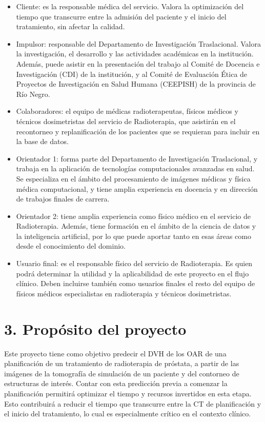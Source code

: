 \documentclass[
11pt, %
codirector, %
]{charter}
\begin{document}
\begin{itemize}
	\item Cliente: es la responsable médica del servicio. Valora la optimización del tiempo que transcurre entre la admisión del paciente y el inicio del tratamiento, sin afectar la calidad.
	\item Impulsor: responsable del Departamento de Investigación Traslacional. Valora la investigación, el desarrollo y las actividades académicas en la institución. Además, puede asistir en la presentación del trabajo al Comité de Docencia e Investigación (CDI) de la institución, y al Comité de Evaluación Ética de Proyectos de Investigación en Salud Humana (CEEPISH) de la provincia de Río Negro. 
	\item Colaboradores: el equipo de médicas radioterapeutas, físicos médicos y técnicos dosimetristas del servicio de Radioterapia, que asistirán en el recontorneo y replanificación de los pacientes que se requieran para incluir en la base de datos.
	\item Orientador 1: forma parte del Departamento de Investigación Traslacional, y trabaja en la aplicación de tecnologías computacionales avanzadas en salud. Se especializa en el ámbito del procesamiento de imágenes médicas y física médica computacional, y tiene amplia experiencia en docencia y en dirección de trabajos finales de carrera.
	\item Orientador 2: tiene amplia experiencia como físico médico en el servicio de Radioterapia. Además, tiene formación en el ámbito de la ciencia de datos y la inteligencia artificial, por lo que puede aportar tanto en esas áreas como desde el conocimiento del dominio.
	\item Usuario final: es el responsable físico del servicio de Radioterapia. Es quien podrá determinar la utilidad y la aplicabilidad de este proyecto en el flujo clínico. Deben incluirse también como usuarios finales el resto del equipo de físicos médicos especialistas en radioterapia y técnicos dosimetristas.
\end{itemize}


\section{3. Propósito del proyecto}
\label{sec:proposito}

Este proyecto tiene como objetivo predecir el DVH de los OAR de una planificación de un tratamiento de radioterapia de próstata, a partir de las imágenes de la tomografía de simulación de un paciente y del contorneo de estructuras de interés. Contar con esta predicción previa a comenzar la planificación permitirá optimizar el tiempo y recursos invertidos en esta etapa. Esto contribuirá a reducir el tiempo que transcurre entre la CT de planificación y el inicio del tratamiento, lo cual es especialmente crítico en el contexto clínico.
\end{document}
